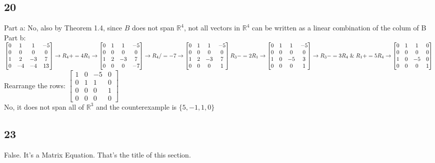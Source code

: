 \documentclass{article}
\begin{document}
\subsection*{20}
Part a: No, also by Theorem 1.4, since $B$ does not span $\mathbb{R}^4$, not all vectors in $\mathbb{R}^4$ can be written as a linear combination of the colum of B
\\[0.1in]Part b: $\begin{bmatrix}0 & 1 & 1 & -5 \\0 & 0 & 0 & 0 \\1 & 2 & -3 & 7 \\0 & -4 & -4 & 13\end{bmatrix}\rightarrow R_4 += 4R_1 \rightarrow 
\begin{bmatrix}0 & 1 & 1 & -5 \\0 & 0 & 0 & 0 \\1 & 2 & -3 & 7 \\0 & 0 & 0 & -7\end{bmatrix} \rightarrow R_4 /=-7 \rightarrow \begin{bmatrix}0 & 1 & 1 & -5 \\0 & 0 & 0 & 0 \\1 & 2 & -3 & 7 \\0 & 0 & 0 & 1\end{bmatrix} \\[0.1in]
R_3 -=2R_1 \rightarrow \begin{bmatrix}0 & 1 & 1 & -5 \\0 & 0 & 0 & 0 \\1 & 0 & -5 & 3 \\0 & 0 & 0 & 1\end{bmatrix} \rightarrow R_3 -= 3R_4 \; \& \; R_1+=5R_4 \rightarrow \begin{bmatrix}0 & 1 & 1 & 0 \\0 & 0 & 0 & 0 \\1 & 0 & -5 & 0 \\0 & 0 & 0 & 1\end{bmatrix}$
\\[0.1in] Rearrange the rows: $\begin{bmatrix}1 & 0 & -5 & 0 \\0 & 1 & 1 & 0 \\0 & 0 & 0 & 1\\0 & 0 & 0 & 0 \end{bmatrix}$ 
\\[0.1in] No, it does not span all of $\mathbb{R}^3$ and the counterexample is $\{ 5, -1, 1, 0 \}$
\subsection*{23}
False. It's a Matrix Equation. That's the title of this section.
\end{document}
